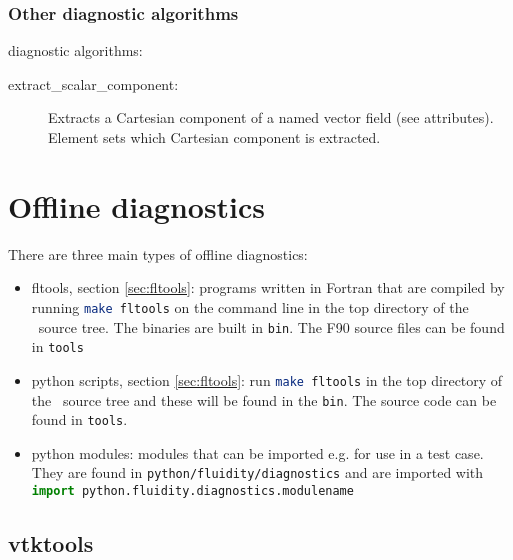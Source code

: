 \subsubsection{Other diagnostic algorithms}

 diagnostic algorithms:

\begin{description}
\item[extract\_scalar\_component:] Extracts a Cartesian component of a
  named vector field (see attributes). Element  sets 
  which Cartesian component is extracted.
\end{description}



\section{Offline diagnostics}
\label{sec:offline_diagnostics}

There are three main types of offline diagnostics:
\begin{itemize}
\item fltools, section \ref{sec:fltools}: programs written in Fortran that are compiled by running \lstinline[language = bash]+make fltools+ on the command line in the top directory of the \fluidity\ source tree. The binaries are built in \lstinline[language = bash]+bin+. The F90 source files can be found in \lstinline[language = bash]+tools+
\item python scripts, section \ref{sec:fltools}: run \lstinline[language = bash]+make fltools+ in the top directory of the \fluidity\ source tree and these will be found in the \lstinline[language = bash]+bin+. The source code can be found in \lstinline[language = bash]+tools+.
\item python modules: modules that can be imported e.g. for use in a test case. They are found in \lstinline[language = XML]+python/fluidity/diagnostics+ and are imported with  \\ \lstinline[language = python]+import python.fluidity.diagnostics.modulename+
\end{itemize}

\subsection{vtktools}
\label{sec:diagnostics_vtk_tools}

